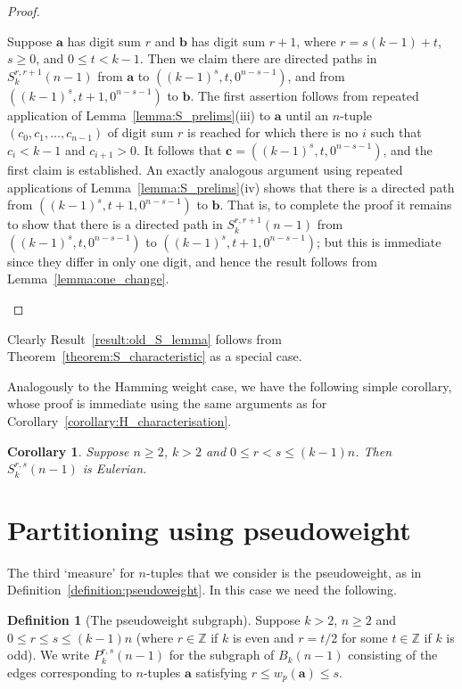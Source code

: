 \documentclass[a4paper,11pt]{article}
\theoremstyle{plain}
\newtheorem{corollary}[lemma]{Corollary}
\theoremstyle{definition}
\newtheorem{definition}{Definition}[section]
\theoremstyle{remark}
\begin{document}
\begin{proof}
\begin{itemize}
Suppose $\mathbf{a}$ has digit sum $r$ and $\mathbf{b}$ has digit sum $r+1$, where
$r=s(k-1)+t$, $s\geq 0$, and $0\leq t<k-1$. Then we claim there are directed paths in
$S_k^{r,r+1}(n-1)$ from $\mathbf{a}$ to $((k-1)^s,t,0^{n-s-1})$, and from
$((k-1)^s,t+1,0^{n-s-1})$ to $\mathbf{b}$.  The first assertion follows from repeated
application of Lemma~\ref{lemma:S_prelims}(iii) to $\mathbf{a}$ until an $n$-tuple
$(c_0,c_1,\dots,c_{n-1})$ of digit sum $r$ is reached for which there is no $i$ such that
$c_i<k-1$ and $c_{i+1}>0$.  It follows that $\mathbf{c}=((k-1)^s,t,0^{n-s-1})$, and the
first claim is established.  An exactly analogous argument using repeated applications of
Lemma~\ref{lemma:S_prelims}(iv) shows that there is a directed path from
$((k-1)^s,t+1,0^{n-s-1})$ to $\mathbf{b}$.  That is, to complete the proof it remains to
show that there is a directed path in $S_k^{r,r+1}(n-1)$ from $((k-1)^s,t,0^{n-s-1})$ to
$((k-1)^s,t+1,0^{n-s-1})$; but this is immediate since they differ in only one digit, and
hence the result follows from Lemma~\ref{lemma:one_change}.
\end{itemize}
\end{proof}

Clearly Result~\ref{result:old_S_lemma} follows from Theorem~\ref{theorem:S_characteristic} as
a special case.

Analogously to the Hamming weight case, we have the following simple corollary, whose proof is
immediate using the same arguments as for Corollary~\ref{corollary:H_characterisation}.

\begin{corollary} \label{corollary:S_characteristic}
Suppose $n\geq2$, $k>2$ and $0\leq r< s\leq (k-1)n$. Then $S_k^{r,s}(n-1)$ is Eulerian.
\end{corollary}

\section{Partitioning using pseudoweight}

The third `measure' for $n$-tuples that we consider is the pseudoweight, as in
Definition~\ref{definition:pseudoweight}.  In this case we need the following.

\begin{definition}[The pseudoweight subgraph]
Suppose $k>2$, $n\geq 2$ and $0\leq r\leq s\leq (k-1)n$ (where $r\in\mathbb{Z}$ if $k$ is even and
$r=t/2$ for some $t\in\mathbb{Z}$ if $k$ is odd). We write $P_k^{r,s}(n-1)$ for the subgraph of
$B_k(n-1)$ consisting of the edges corresponding to $n$-tuples $\mathbf{a}$ satisfying $r\leq
w_p(\mathbf{a})\leq s$.
\end{definition}
\end{document}
